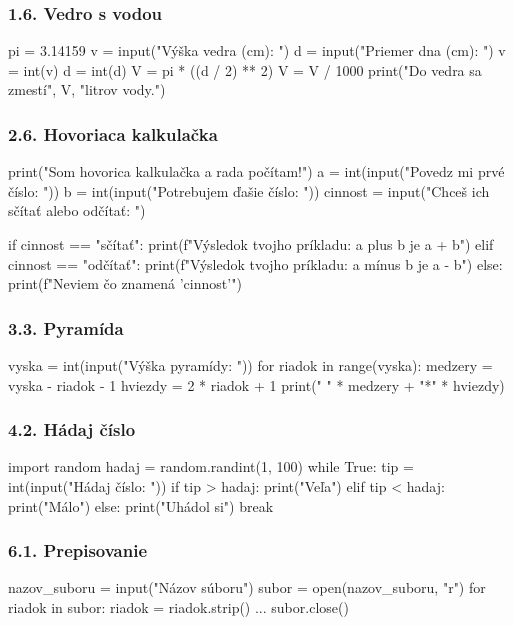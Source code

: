 \subsubsection*{1.6. Vedro s vodou}
\begin{solution}
pi = 3.14159
v = input("Výška vedra (cm): ")
d = input("Priemer dna (cm): ")
v = int(v)
d = int(d)
V = pi * ((d / 2) ** 2)
V = V / 1000
print("Do vedra sa zmestí", V, "litrov vody.")
\end{solution} 

\subsubsection*{2.6. Hovoriaca kalkulačka}
\begin{solution}
print("Som hovorica kalkulačka a rada počítam!")
a = int(input("Povedz mi prvé číslo: "))
b = int(input("Potrebujem ďašie číslo: "))
cinnost = input("Chceš ich sčítať alebo odčítať: ")

if cinnost == "sčítať":
    print(f"Výsledok tvojho príkladu: {a} plus {b} je {a + b}")
elif cinnost == "odčítať":
    print(f"Výsledok tvojho príkladu: {a} mínus {b} je {a - b}")
else:
    print(f"Neviem čo znamená '{cinnost}'")
\end{solution}

\subsubsection*{3.3. Pyramída}
\begin{solution}
vyska = int(input("Výška pyramídy: "))
for riadok in range(vyska):
    medzery = vyska - riadok - 1
    hviezdy = 2 * riadok + 1
    print(" " * medzery + "*" * hviezdy)
\end{solution}

\subsubsection*{4.2. Hádaj číslo}
\begin{solution}
import random
hadaj = random.randint(1, 100)
while True:
	tip = int(input("Hádaj číslo: "))
	if tip > hadaj:
		print("Veľa")
	elif tip < hadaj:
        print("Málo")
    else:
        print("Uhádol si")
        break
\end{solution}

\subsubsection*{6.1. Prepisovanie}
\begin{solution}
nazov_suboru = input("Názov súboru")
subor = open(nazov_suboru, "r")
for riadok in subor:
    riadok = riadok.strip()
    ...
subor.close()
\end{solution}